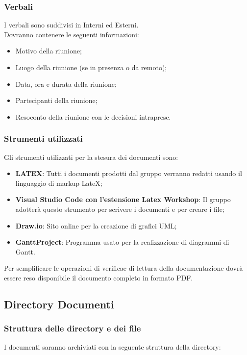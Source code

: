 \subsubsection{Verbali}\label{Verbali}
I verbali sono suddivisi in Interni ed Esterni.\\
Dovranno contenere le seguenti informazioni:
\begin{itemize}
    \item Motivo della riunione;
    \item Luogo della riunione (se in presenza o da remoto);
    \item Data, ora e durata della riunione;
    \item Partecipanti della riunione;
    \item Resoconto della riunione con le decisioni intraprese.
\end{itemize}

\subsubsection{Strumenti utilizzati}
Gli strumenti utilizzati per la stesura dei documenti sono:
\begin{itemize}
    \item \textbf{LATEX}: Tutti i documenti prodotti dal gruppo verranno redatti usando il linguaggio di markup LateX;
    \item \textbf{Visual Studio Code con l’estensione Latex Workshop}: Il gruppo adotterà questo strumento per scrivere i documenti e per creare i file;
    \item \textbf{Draw.io}: Sito online per la creazione di grafici UML;
    \item \textbf{GanttProject}: Programma usato per la realizzazione di diagrammi di Gantt.
\end{itemize}
Per semplificare le operazioni di verifica\glo e di lettura della documentazione dovrà essere reso disponibile il documento completo in formato PDF.


\newpage
\subsection{Directory Documenti}
\subsubsection{Struttura delle directory e dei file}\label{Dir}
I documenti saranno archiviati con la seguente struttura della directory: \\


